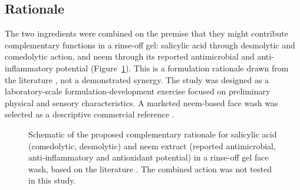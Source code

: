 \documentclass[10pt,a4paper,twocolumn]{article}
\begin{document}
\subsection{Rationale}

The two ingredients were combined on the premise that they might
contribute complementary functions in a rinse-off gel: salicylic acid
through desmolytic and comedolytic action, and neem through its reported
antimicrobial and anti-inflammatory potential
(Figure~\ref{fig:rationale}). This is a formulation rationale drawn from
the literature
\citep{decker2012,arif2015,singh2021,kumar2013,gupta2017,alzohairy2016,brar2025},
not a demonstrated synergy. The study was designed as a laboratory-scale
formulation-development exercise focused on preliminary physical and
sensory characteristics. A marketed neem-based face wash was selected as
a descriptive commercial reference \citep{himalaya2026}.

\begin{figure}[t]
\centering
{}
\caption{Schematic of the proposed complementary rationale for salicylic
acid (comedolytic, desmolytic) and neem extract (reported antimicrobial,
anti-inflammatory and antioxidant potential) in a rinse-off gel face
wash, based on the literature
\citep{decker2012,arif2015,singh2021,kumar2013,gupta2017,alzohairy2016,brar2025}.
The combined action was not tested in this study.}
\label{fig:rationale}
\end{figure}
\end{document}

